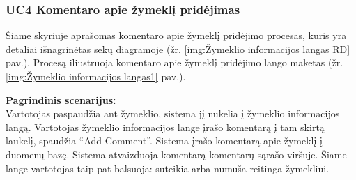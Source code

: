 \documentclass{VUMIFPSkursinis}
\begin{document}
\subsubsection{UC4 Komentaro apie žymeklį pridėjimas}
	Šiame skyriuje aprašomas komentaro apie žymeklį pridėjimo procesas,  kuris yra detaliai išnagrinėtas sekų diagramoje (žr. \ref{img:Žymeklio informacijos langas RD} pav.). 
	Procesą iliustruoja komentaro apie žymeklį pridėjimo lango maketas (žr. \ref{img:Žymeklio informacijos langas1} pav.).

	\textbf{Pagrindinis scenarijus:}\\
    Vartotojas paspaudžia ant žymeklio, sistema jį nukelia į žymeklio informacijos langą. Vartotojas žymeklio informacijos lange įrašo komentarą į tam skirtą laukelį, spaudžia “Add Comment”. Sistema įrašo komentarą apie žymeklį į duomenų bazę. Sistema atvaizduoja komentarą komentarų sąrašo viršuje. Šiame lange vartotojas taip pat balsuoja: suteikia arba numuša reitinga žymekliui.
\end{document}
